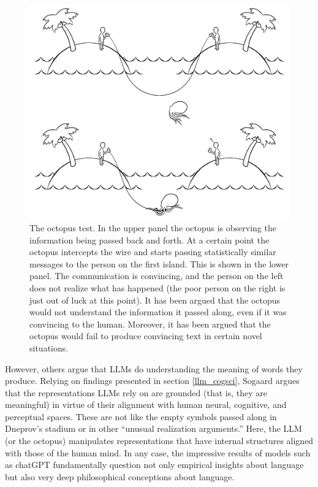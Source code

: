 \begin{figure}[h]
\centering
\includegraphics[scale=.20]{./images/octopusTest.png}
\caption[Soraya Boza.]{The octopus test. In the upper panel the octopus is observing the information being passed back and forth. At a certain point the octopus intercepts the wire and starts passing statistically similar messages to the person on the first island. This is shown in the lower panel. The communication is convincing, and the person on the left does not realize what has happened (the poor person on the right is just out of luck at this point). It has been argued that the octopus would not understand the information it passed along, even if it was convincing to the human. Moreover, it has been argued that the octopus would fail to produce convincing text in certain novel situations.}
\label{octopusTest}
\end{figure}

However, others argue that LLMs do understanding the meaning of words they produce. Relying on findings presented in section \ref{llm_cogsci}, Sogaard \cite{sogaard2023grounding} argues that the representations LLMs rely on are grounded (that is, they are meaningful) in virtue of their alignment with human neural, cognitive, and perceptual spaces. These are not like the empty symbols passed along in Dneprov's stadium or in other ``unusual realization arguments.'' Here, the LLM (or the octopus) manipulates representations that have internal structures aligned with those of the human mind. In any case, the impressive results of models such as chatGPT fundamentally question not only empirical insights about language but also very deep philosophical conceptions about language.

